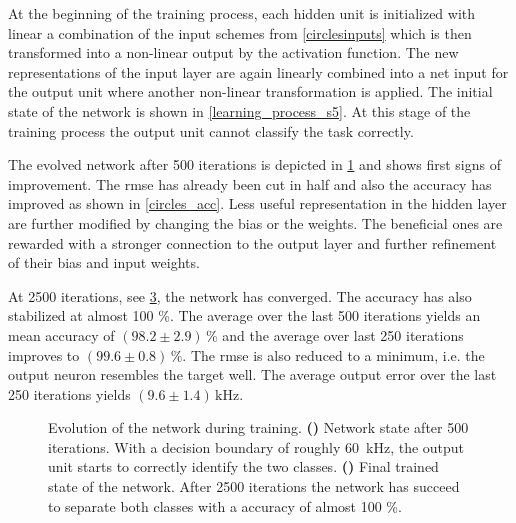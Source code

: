 At the beginning of the training process, each hidden unit is initialized with linear a combination of the input schemes from \cref{circlesinputs} which is then transformed into a non-linear output by the activation function. The new representations of the input layer are again linearly combined into a net input for the output unit where another non-linear transformation is applied. The initial state of the network is shown in \cref{learning_process_s5}. At this stage of the training process the output unit cannot classify the task correctly. 

%	

The evolved network after 500 iterations is depicted in \cref{learning_process_s500} and shows first signs of improvement. The \gls{rmse} has already been cut in half and also the accuracy has improved as shown in \cref{circles_acc}. Less useful representation in the hidden layer are further modified by changing the bias or the weights. The beneficial ones are rewarded with a stronger connection to the output layer and further refinement of their bias and input weights.

At 2500 iterations, see \cref{learning_process_s2500}, the network has converged. The accuracy has also stabilized at almost 100 \%. The average over the last 500 iterations yields an mean accuracy of $(98.2 \pm 2.9)\,\%$ and the average over last 250 iterations improves to  $(99.6 \pm 0.8)\,\%$. The \gls{rmse} is also reduced to a minimum, i.e. the output neuron resembles the target well. The average output error over the last 250 iterations yields $(9.6 \pm 1.4)\,\si{\kilo \Hz}$.

\begin{figure}
	\begin{subfigure}{\textwidth}
		\caption{}
		\centering
		
		\label{learning_process_s500}
	\end{subfigure}
	\begin{subfigure}{\textwidth}
		\caption{}
		\centering
		
		\label{learning_process_s2500}
	\end{subfigure}
	\caption[Evolution of the network during training.]{Evolution of the network during training. \textbf{()} Network state after 500 iterations. With a decision boundary of roughly \SI{60}{\kilo \Hz}, the output unit starts to correctly identify the two classes. \textbf{()} Final trained state of the network. After 2500 iterations the network has succeed to separate both classes with a accuracy of almost 100 \%.}
\end{figure}

